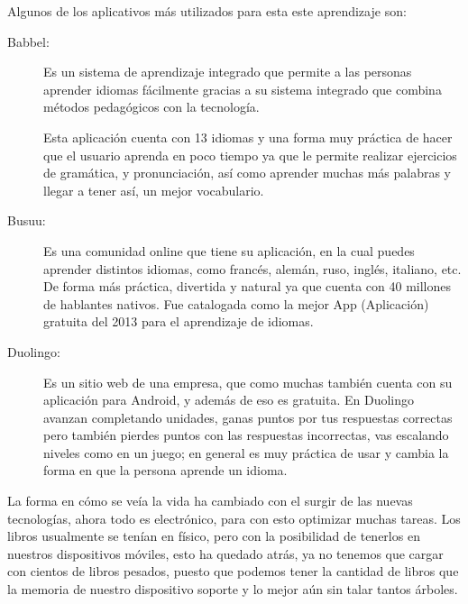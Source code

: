 Algunos de los aplicativos más utilizados para esta este aprendizaje son:
\begin{description}
	\item[Babbel:]
		Es un sistema de aprendizaje integrado que permite a las personas aprender idiomas fácilmente gracias a su sistema integrado que combina métodos pedagógicos con la 
		tecnología.

		Esta aplicación cuenta con 13 idiomas y una forma muy práctica de hacer que el usuario aprenda en poco tiempo ya que le permite realizar ejercicios de gramática, y 	
		pronunciación, así como aprender muchas más palabras y llegar a tener así, un mejor vocabulario.
	
	\item[Busuu:]
		Es una comunidad online que tiene su aplicación, en la cual puedes aprender distintos idiomas, como francés, alemán, ruso, inglés, italiano, etc. De forma más práctica, 
		divertida y natural ya que cuenta con 40 millones de hablantes nativos. Fue catalogada como la mejor App (Aplicación) gratuita del 2013 para el aprendizaje de idiomas.
		
	\item[Duolingo:]
		Es un sitio web de una empresa, que como muchas también cuenta con su aplicación para Android, y además de eso es gratuita. En Duolingo avanzan completando unidades, ganas 
		puntos por tus respuestas correctas pero también pierdes puntos con las respuestas incorrectas, vas escalando niveles como en un juego; en general es muy práctica de usar y 
		cambia la forma en que la persona aprende un idioma.
\end{description}

La forma en cómo se veía la vida ha cambiado con el surgir de las nuevas tecnologías, ahora todo es electrónico, para con esto optimizar muchas tareas. Los libros usualmente se 
tenían en físico, pero con la posibilidad de tenerlos en nuestros dispositivos móviles, esto ha quedado atrás, ya no tenemos que cargar con cientos de libros pesados, puesto que 
podemos tener la cantidad de libros que la memoria de nuestro dispositivo soporte y lo mejor aún sin talar tantos árboles.
 
